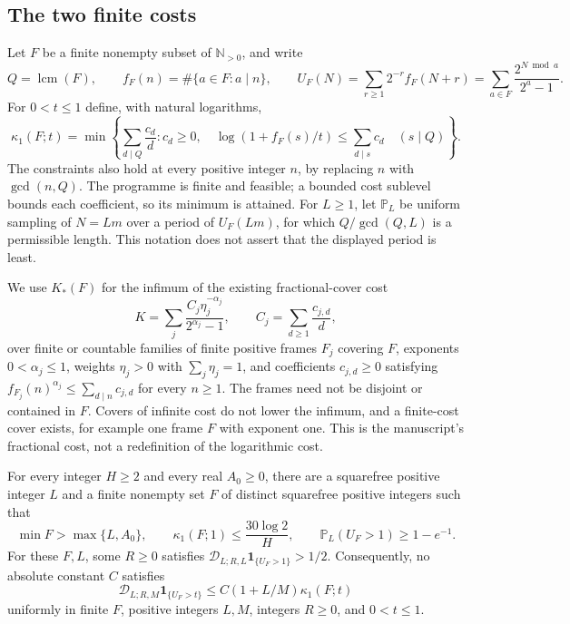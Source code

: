 \subsection{The two finite costs}
Let $F$ be a finite nonempty subset of $\mathbb N_{>0}$, and write
\[
 Q=\operatorname{lcm}(F),\qquad f_F(n)=\#\{a\in F:a\mid n\},\qquad
 U_F(N)=\sum_{r\ge1}2^{-r}f_F(N+r)
       =\sum_{a\in F}\frac{2^{N\bmod a}}{2^a-1}.
\]
For $0<t\le1$ define, with natural logarithms,
\begin{equation}
 \kappa_1(F;t)=\min\left\{\sum_{d\mid Q}\frac{c_d}{d}:
 c_d\ge0,\quad
 \log(1+f_F(s)/t)\le\sum_{d\mid s}c_d\quad(s\mid Q)\right\}.
 \label{eq:257-logarithmic-cost}
\end{equation}
The constraints also hold at every positive integer $n$, by replacing $n$
with $\gcd(n,Q)$.  The programme is finite and feasible; a bounded cost
sublevel bounds each coefficient, so its minimum is attained.
For $L\ge1$, let $\mathbb P_L$ be uniform sampling of $N=Lm$ over a
period of $U_F(Lm)$, for which $Q/\gcd(Q,L)$ is a permissible length.
This notation does not assert that the displayed period is least.

We use $K_*(F)$ for the infimum of the existing fractional-cover cost
\begin{equation}
 K=\sum_j\frac{C_j\eta_j^{-\alpha_j}}{2^{\alpha_j}-1},\qquad
 C_j=\sum_{d\ge1}\frac{c_{j,d}}d,
 \label{eq:257-optimised-cover-cost}
\end{equation}
over finite or countable families of finite positive frames $F_j$ covering
$F$, exponents $0<\alpha_j\le1$, weights $\eta_j>0$ with
$\sum_j\eta_j=1$, and coefficients $c_{j,d}\ge0$ satisfying
$f_{F_j}(n)^{\alpha_j}\le\sum_{d\mid n}c_{j,d}$ for every $n\ge1$.
The frames need not be disjoint or contained in $F$.  Covers of infinite
cost do not lower the infimum, and a finite-cost cover exists, for example
one frame $F$ with exponent one.  This is the manuscript's fractional cost,
not a redefinition of the logarithmic cost.

\begin{thm}\label{thm:257-logarithmic-counterexample}
For every integer $H\ge2$ and every real $A_0\ge0$, there are a
squarefree positive integer $L$ and a finite nonempty set $F$ of distinct
squarefree positive integers such that
\[
 \min F>\max\{L,A_0\},\qquad
 \kappa_1(F;1)\le\frac{30\log2}{H},\qquad
 \mathbb P_L(U_F>1)\ge1-e^{-1}.
\]
For these $F,L$, some $R\ge0$ satisfies
$\mathscr D_{L;R,L}\mathbf1_{\{U_F>1\}}>1/2$.
Consequently, no absolute constant $C$ satisfies
\begin{equation*}
 \mathscr D_{L;R,M}\mathbf1_{\{U_F>t\}}
 \le C(1+L/M)\kappa_1(F;t)
 \tag{E}
\end{equation*}
uniformly in finite $F$, positive integers $L,M$, integers $R\ge0$,
and $0<t\le1$.
\end{thm}

